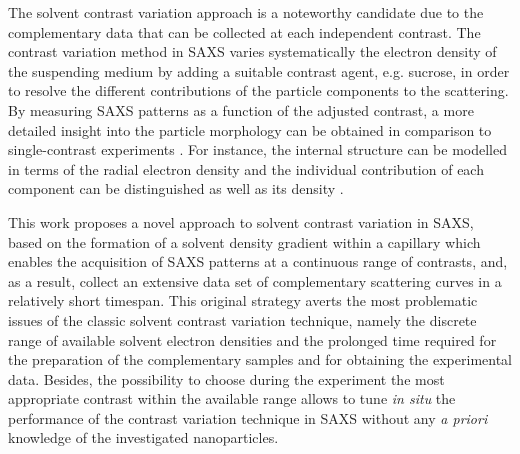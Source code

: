 The solvent contrast variation approach is a noteworthy candidate due to the complementary data that can be collected at each independent contrast. The contrast variation method in SAXS varies systematically the electron density of the suspending medium by adding a suitable contrast agent, e.g. sucrose, in order to resolve the different contributions of the particle components to the scattering. By measuring SAXS patterns as a function of the adjusted contrast, a more detailed insight into the particle morphology can be obtained in comparison to single-contrast experiments \citep{bolze_situ_2004}. For instance, the internal structure can be modelled in terms of the radial electron density \citep{dingenouts_radial_1994,dingenouts_analysis_1999,ballauff_analysis_2011,ballauff_small-angle_1996} and the individual contribution of each component can be distinguished \citep{beyer_saxs_1990,grunder_analysis_1991,grunder_small-angle_1993,ottewill_characterization_1995,bolze_small-angle_1997,dingenouts_structure_1994} as well as its density \citep{mykhaylyk_application_2007}.

This work proposes a novel approach to solvent contrast variation in SAXS, based on the formation of a solvent density gradient within a capillary which enables the acquisition of SAXS patterns at a continuous range of contrasts, and, as a result, collect an extensive data set of complementary scattering curves in a relatively short timespan. This original strategy averts the most problematic issues of the classic solvent contrast variation technique, namely the discrete range of available solvent electron densities and the prolonged time required for the preparation of the complementary samples and for obtaining the experimental data. Besides, the possibility to choose during the experiment the most appropriate contrast within the available range allows to tune \emph{in situ} the performance of the contrast variation technique in SAXS without any \emph{a priori} knowledge of the investigated nanoparticles.

